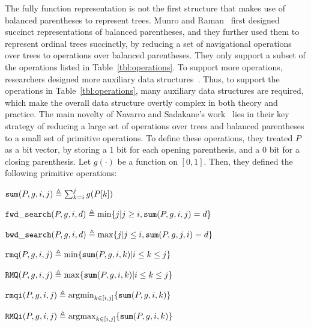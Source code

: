 
The fully function representation is not the first structure that makes use of balanced parentheses to represent trees. 
Munro and Raman~\cite{mr1997} first designed succinct representations of balanced parentheses, and they further used them to represent ordinal trees succinctly, by reducing a set of navigational operations over trees to operations over balanced parentheses. 
They only support a subset of the operations listed in Table~\ref{tbl:operations}. 
To support more operations, researchers designed more auxiliary data structures~\cite{ly2008}. 
Thus, to support the operations in Table~\ref{tbl:operations}, many auxiliary data structures are required, which make the overall data structure overtly complex in both theory and practice. 
The main novelty of Navarro and Sadakane's work~\cite{Navarro:2014:FFS:2620785.2601073} lies in their key strategy of reducing a large set of operations over trees and balanced parentheses to a small set of primitive operations. 
To define these operations, they treated $P$ as a bit vector, by storing a $1$ bit for each opening parenthesis, and a $0$ bit for a closing parenthesis. 
Let $g(\cdot)$ be a function on $[0,1]$. Then, they defined the following primitive operations:

\begin{myitemize}
\item $\mathtt{sum}(P,g,i,j)\triangleq \sum_{k=i}^jg(P[k])$
\item $\mathtt{fwd\_search}(P,g,i,d)\triangleq \min\{j | j \ge i, \mathtt{sum}(P,g,i,j) = d\}$
\item $\mathtt{bwd\_search}(P,g,i,d)\triangleq \max\{j | j \le i, \mathtt{sum}(P,g,j,i) = d\}$
\item $\mathtt{rmq}(P,g,i,j)\triangleq \min\{\mathtt{sum}(P,g,i,k)| i\le k\le j\}$
\item $\mathtt{RMQ}(P,g,i,j)\triangleq \max\{\mathtt{sum}(P,g,i,k)| i\le k\le j\}$
\item $\mathtt{rmqi}(P,g,i,j)\triangleq \operatorname*{arg\!\min}_{k\in[i,j]}\{\mathtt{sum}(P,g,i,k)\}$
\item $\mathtt{RMQi}(P,g,i,j)\triangleq \operatorname*{arg\!\max}_{k\in[i,j]}\{\mathtt{sum}(P,g,i,k)\}$
\end{myitemize}

